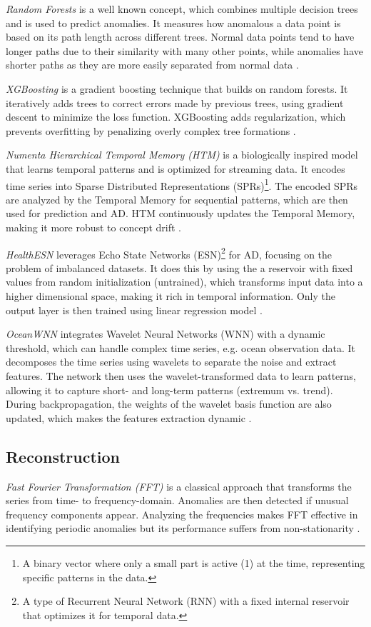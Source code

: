 \textit{Random Forests} is a well known concept, which combines multiple decision trees and is used to predict anomalies. It measures how anomalous a data point is based on its path length across different trees. Normal data points tend to have longer paths due to their similarity with many other points, while anomalies have shorter paths as they are more easily separated from normal data \cite{RForest}. 

\textit{XGBoosting} is a gradient boosting technique that builds on random forests. It iteratively adds trees to correct errors made by previous trees, using gradient descent to minimize the loss function. XGBoosting adds regularization, which prevents overfitting by penalizing overly complex tree formations \cite{XGBoosting}.

\textit{Numenta Hierarchical Temporal Memory (HTM)} is a biologically inspired model that learns temporal patterns and is optimized for streaming data. It encodes time series into Sparse Distributed Representations (SPRs)\footnote{A binary vector where only a small part is active (1) at the time, representing specific patterns in the data.}. The encoded SPRs are analyzed by the Temporal Memory for sequential patterns, which are then used for prediction and AD. HTM continuously updates the Temporal Memory, making it more robust to concept drift \cite{NumentaHTM}.

\textit{HealthESN} leverages Echo State Networks (ESN)\footnote{A type of Recurrent Neural Network (RNN) with a fixed internal reservoir that optimizes it for temporal data.} for AD, focusing on the problem of imbalanced datasets. It does this by using the a reservoir with fixed values from random initialization (untrained), which transforms input data into a higher dimensional space, making it rich in temporal information. Only the output layer is then trained using linear regression model \cite{HealthESN}.

\textit{OceanWNN} integrates Wavelet Neural Networks (WNN) with a dynamic threshold, which can handle complex time series, e.g. ocean observation data. It decomposes the time series using wavelets to separate the noise and extract features. The network then uses the wavelet-transformed data to learn patterns, allowing it to capture short- and long-term patterns (extremum vs. trend). During backpropagation, the weights of the wavelet basis function are also updated, which makes the features extraction dynamic \cite{OceanWNN}.


\subsection{Reconstruction}
\textit{Fast Fourier Transformation (FFT)} is a classical approach that transforms the series from time- to frequency-domain. Anomalies are then detected if unusual frequency components appear. Analyzing the frequencies makes FFT effective in identifying periodic anomalies but its performance suffers from non-stationarity \cite{FFT}.

